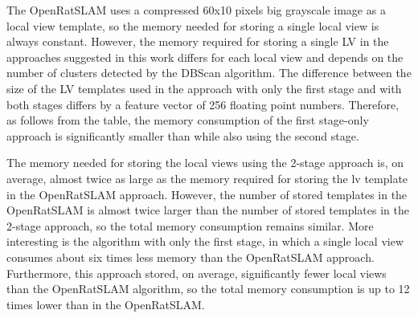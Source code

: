 The OpenRatSLAM uses a compressed 60x10 pixels big grayscale image as a local view template, so the memory needed for storing a single local view is always constant. However, the memory required for storing a single LV in the approaches suggested in this work differs for each local view and depends on the number of clusters detected by the DBScan algorithm. The difference between the size of the LV templates used in the approach with only the first stage and with both stages differs by a feature vector of 256 floating point numbers. Therefore, as follows from the table, the memory consumption of the first stage-only approach is significantly smaller than while also using the second stage.\par
The memory needed for storing the local views using the 2-stage approach is, on average, almost twice as large as the memory required for storing the lv template in the OpenRatSLAM approach. However, the number of stored templates in the OpenRatSLAM is almost twice larger than the number of stored templates in the 2-stage approach, so the total memory consumption remains similar. More interesting is the algorithm with only the first stage, in which a single local view consumes about six times less memory than the OpenRatSLAM approach. Furthermore, this approach stored, on average, significantly fewer local views than the OpenRatSLAM algorithm, so the total memory consumption is up to 12 times lower than in the OpenRatSLAM.
